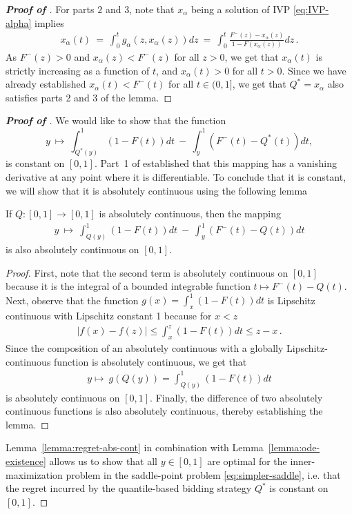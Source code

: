 \begin{proof}[\textbf{Proof of }]
	For parts $2$ and $3$, note that $x_\alpha$ being a solution of IVP \eqref{eq:IVP-alpha} implies
	\begin{align*}
		x_\alpha(t)\ =\ \int_0^t g_\alpha(z, x_\alpha(z)) dz\ =\ \int_0^t \frac{F^-(z) - x_\alpha(z)}{1 - F(x_\alpha(z))} dz\,.
	\end{align*}
	As $F^-(z) > 0$ and $x_\alpha(z) < F^-(z)$ for all $z > 0$, we get that $x_\alpha(t)$ is strictly increasing as a function of $t$, and $x_\alpha(t) > 0$ for all $t >0$. Since we have already established $x_\alpha(t) < F^-(t)$ for all $t \in (0,1]$, we get that $Q^* = x_\alpha$ also satisfies parts 2 and 3 of the lemma.
\end{proof}



\begin{proof}[\textbf{Proof of }]

We would like to show that the function
\begin{equation*}
		y\ \mapsto\ \int_{Q^*(y)}^1 (1 - F(t)) dt\ -\ \int_y^1 (F^-(t) - Q^*(t)) dt,
\end{equation*}
is constant on $ [0,1]$. Part~1 of  established that this mapping has a vanishing derivative at any point where it is differentiable. To conclude that it is constant, we will show that it is absolutely continuous using the following lemma
\begin{lemma}\label{lemma:regret-abs-cont}
	If $Q:[0,1] \to [0,1]$ is absolutely continuous, then the mapping
	\begin{align*}
		y\ \mapsto\ \int_{Q(y)}^1 (1 - F(t)) dt\ -\ \int_y^1 (F^-(t) - Q(t)) dt
	\end{align*}
	 is also absolutely continuous on $[0,1]$.
\end{lemma}
\begin{proof}
	First, note that the second term is absolutely continuous on $[0,1]$ because it is the integral of a bounded integrable function $t \mapsto F^-(t) - Q(t)$. Next, observe that the function $g(x) = \int_x^1 (1 - F(t))dt$ is Lipschitz continuous with Lipschitz constant 1 because for $x < z$
	\begin{align*}
		|f(x) - f(z)| \leq \int_x^z (1 - F(t)) dt \leq z - x\,. 
	\end{align*}
	Since the composition of an absolutely continuous with a globally Lipschitz-continuous function is absolutely continuous, we get that
	\begin{align*}
		y \mapsto\ g\left( Q(y) \right) = \int_{Q(y)}^1 (1 - F(t)) dt
	\end{align*}
	is absolutely continuous on $[0,1]$. Finally, the difference of two absolutely continuous functions is also absolutely continuous, thereby establishing the lemma.
\end{proof}
Lemma~\ref{lemma:regret-abs-cont} in combination with Lemma~\ref{lemma:ode-existence} allows us to show that all $y \in [0,1]$ are optimal for the inner-maximization problem in the saddle-point problem \eqref{eq:simpler-saddle}, i.e. that the regret incurred by the quantile-based bidding strategy $Q^*$ is constant on $[0,1]$.


\end{proof}
